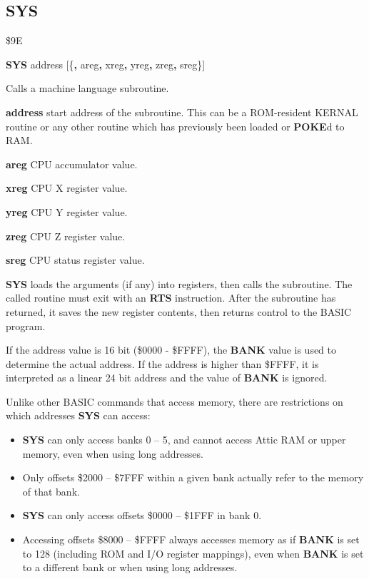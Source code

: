 
\newpage
\subsection{SYS}
\begin{description}[leftmargin=2cm,style=nextline]
\item [Token:]    \$9E

\item [Format:]   {\bf SYS} address [\{{\bf,} areg{\bf,} xreg{\bf,} yreg{\bf,}	zreg{\bf,} sreg\}]

\item [Usage:]    Calls a machine language subroutine.

                  {\bf address} start address of the subroutine. This can be a ROM-resident KERNAL routine or any other routine which has previously been loaded or {\bf POKE}d to RAM.

                  {\bf areg} CPU accumulator value.

                  {\bf xreg} CPU X register value.

                  {\bf yreg} CPU Y register value.

                  {\bf zreg} CPU Z register value.

                  {\bf sreg} CPU status register value.

                  {\bf SYS} loads the arguments (if any) into registers, then calls the subroutine. The called routine must exit with an {\bf RTS} instruction. After the subroutine has returned, it saves the new register contents, then returns control to the BASIC program.

                  If the address value is 16 bit (\$0000 - \$FFFF), the {\bf BANK} value is used to determine the actual address. If the address is higher than \$FFFF, it is interpreted as a linear 24 bit address and the value of {\bf BANK} is ignored.

                  Unlike other BASIC commands that access memory, there are restrictions on which addresses {\bf SYS} can access:

                  \begin{itemize}
                     \item {\bf SYS} can only access banks 0 -- 5, and cannot access Attic RAM or upper memory, even when using long addresses.
                     \item Only offsets \$2000 -- \$7FFF within a given bank actually refer to the memory of that bank.
                     \item {\bf SYS} can only access offsets \$0000 -- \$1FFF in bank 0.
                     \item Accessing offsets \$8000 -- \$FFFF always accesses memory as if {\bf BANK} is set to 128 (including ROM and I/O register mappings), even when {\bf BANK} is set to a different bank or when using long addresses.
                  \end{itemize}


\end{description}
